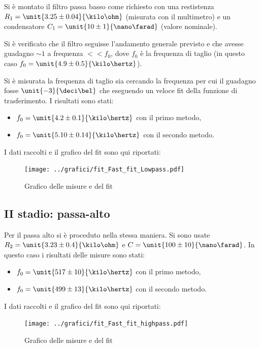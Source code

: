 \documentclass[10pt,a4paper]{article}
\begin{document}
Si è montato il filtro passa basso come richiesto con una restistenza $R_1 = \unit{3.25 \pm 0.04}{\kilo\ohm}$ (misurata con il multimetro) e un condensatore $C_1=\unit{10 \pm 1}{\nano\farad}$ (valore nominale).

Si è verificato che il filtro seguisse l'andamento generale previsto e che avesse guadagno $\sim 1$ a frequenza $<<f_0$, dove $f_0$ è la frequenza di taglio (in questo caso $f_0 = \unit{4.9 \pm 0.5}{\kilo\hertz}$).

Si è misurata la frequenza di taglio sia cercando la frequenza per cui il guadagno fosse $\unit{-3}{\deci\bel}$ che eseguendo un veloce fit della funzione di trasferimento.
I risultati sono stati:
\begin{itemize}
	\item $f_0 = \unit{4.2 \pm 0.1}{\kilo\hertz}$ con il primo metodo,
	\item $f_0 = \unit{5.10 \pm 0.14}{\kilo\hertz}$ con il secondo metodo.
\end{itemize}
I dati raccolti e il grafico del fit sono qui riportati:

\begin{figure}[h!]
	\centering
	
	\centering
	\texttt{[image: ../grafici/fit\_Fast\_fit\_Lowpass.pdf]}
	\caption{Grafico delle misure e del fit}
\end{figure}

\subsection{II stadio: passa-alto}
Per il passa alto si è proceduto nella stessa maniera. Si sono usate $R_2=\unit{3.23 \pm 0.4}{\kilo\ohm}$ e $C=\unit{100 \pm 10}{\nano\farad}$.
In questo caso i risultati delle misure sono stati:
\begin{itemize}
	\item $f_0 = \unit{517 \pm 10}{\kilo\hertz}$ con il primo metodo,
	\item $f_0 = \unit{499 \pm 13}{\kilo\hertz}$ con il secondo metodo.
\end{itemize}

I dati raccolti e il grafico del fit sono qui riportati:

\begin{figure}[h!]
	\centering
	
	\centering
	\texttt{[image: ../grafici/fit\_Fast\_fit\_highpass.pdf]}
	\caption{Grafico delle misure e del fit}
\end{figure}
\end{document}
